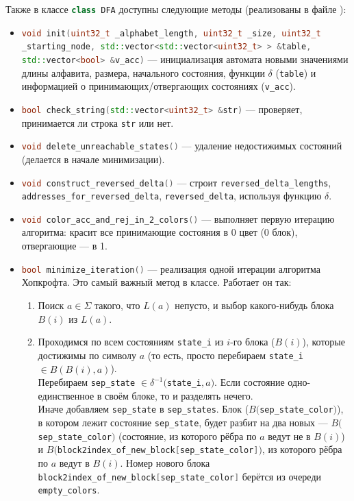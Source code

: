 \documentclass{article}
\begin{document}
Также в классе \lstinline[language=C++]!class DFA! доступны следующие методы (реализованы в файле ):
\begin{itemize}
  \item[\ding{228}] \lstinline[language=C++]!void init(uint32_t _alphabet_length, uint32_t _size, uint32_t _starting_node, std::vector<std::vector<uint32_t> > &table, std::vector<bool> &v_acc)! --- инициализация автомата новыми значениями длины алфавита, размера, начального состояния, функции $\delta$ (\lstinline[language=C++]!table!) и информацией о принимающих/отвергающих состояниях (\lstinline[language=C++]!v_acc!).
  \item[\ding{228}] \lstinline[language=C++]!bool check_string(std::vector<uint32_t> &str)! --- проверяет, принимается ли строка \lstinline[language=C++]!str! или нет.
  \item[\ding{228}] \lstinline[language=C++]!void delete_unreachable_states()! --- удаление недостижимых состояний (делается в начале минимизации).
  \item[\ding{228}] \lstinline[language=C++]!void construct_reversed_delta()! --- строит \lstinline[language=C++]!reversed_delta_lengths!, \lstinline[language=C++]!addresses_for_reversed_delta!, \lstinline[language=C++]!reversed_delta!, используя функцию $\delta$.
  \item[\ding{228}] \lstinline[language=C++]!void color_acc_and_rej_in_2_colors()! --- выполняет первую итерацию алгоритма: красит все принимающие состояния в 0 цвет (0 блок), отвергающие --- в 1.
  \item[\ding{228}] \lstinline[language=C++]!bool minimize_iteration()! --- реализация одной итерации алгоритма Хопкрофта. Это самый важный метод в классе. Работает он так:
  \begin{enumerate}
    \item Поиск $a \in \Sigma$ такого, что $L(a)$ непусто, и выбор какого-нибудь блока $B(i)$ из $L(a)$.
    \item Проходимся по всем состояниям \lstinline[language=C++]!state_i! из $i$-го блока ($B(i)$), которые достижимы по символу $a$ (то есть, просто перебираем \lstinline[language=C++]!state_i! $\in \hat B(B(i), a)$).\\Перебираем \lstinline[language=C++]!sep_state! $\in \delta^{-1}($\lstinline[language=C++]!state_i!$, a)$. Если состояние одно-единственное в своём блоке, то и разделять нечего.\\Иначе добавляем \lstinline[language=C++]!sep_state! в \lstinline[language=C++]!sep_states!. Блок ($B($\lstinline[language=C++]!sep_state_color!$)$), в котором лежит состояние \lstinline[language=C++]!sep_state!, будет разбит на два новых --- $B($\lstinline[language=C++]!sep_state_color!$)$ (состояние, из которого рёбра по $a$ ведут не в $B(i)$) и $B($\lstinline[language=C++]!block2index_of_new_block[sep_state_color]!$)$, из которого рёбра по $a$ ведут в $B(i)$. Номер нового блока \lstinline[language=C++]!block2index_of_new_block[sep_state_color]! берётся из очереди \lstinline[language=C++]!empty_colors!.\\

\end{enumerate}
\end{itemize}
\end{document}
